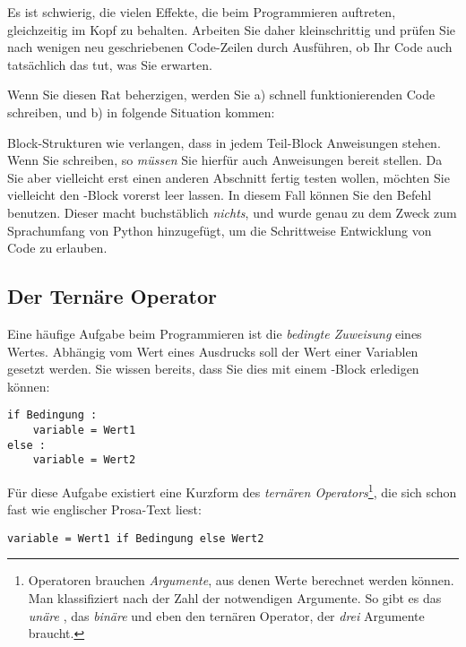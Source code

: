 \begin{hintbox}
Es ist schwierig, die vielen Effekte, die beim Programmieren auftreten, gleichzeitig im Kopf zu behalten. Arbeiten Sie daher kleinschrittig und prüfen Sie nach wenigen neu geschriebenen Code-Zeilen durch Ausführen, ob Ihr Code auch tatsächlich das tut, was Sie erwarten.

Wenn Sie diesen Rat beherzigen, werden Sie \newline
a) schnell funktionierenden Code schreiben, und \newline
b) in folgende Situation kommen:

Block-Strukturen wie  verlangen, dass in jedem Teil-Block Anweisungen stehen. Wenn Sie  schreiben, so \emph{müssen} Sie hierfür auch Anweisungen bereit stellen. Da Sie aber vielleicht erst einen anderen Abschnitt fertig testen wollen, möchten Sie vielleicht den -Block vorerst leer lassen. In diesem Fall können Sie den Befehl  benutzen. Dieser macht buchstäblich \emph{nichts}, und wurde genau zu dem Zweck zum Sprachumfang von Python hinzugefügt, um die Schrittweise Entwicklung von Code zu erlauben.
\end{hintbox}

\subsection{Der Ternäre Operator}
Eine häufige Aufgabe beim Programmieren ist die \emph{bedingte Zuweisung} eines Wertes. Abhängig vom Wert eines Ausdrucks soll der Wert einer Variablen gesetzt werden. Sie wissen bereits, dass Sie dies mit einem -Block erledigen können:
\begin{codebox}
\begin{verbatim}
if Bedingung :
    variable = Wert1
else :
    variable = Wert2
\end{verbatim}
\end{codebox}

Für diese Aufgabe existiert eine Kurzform des \emph{ternären Operators}\footnote{Operatoren brauchen \emph{Argumente}, aus denen Werte berechnet werden können. Man klassifiziert nach der Zahl der notwendigen Argumente. So gibt es das \emph{unäre} , das \emph{binäre} \inPy{+} und eben den ternären Operator, der \emph{drei} Argumente braucht.}, die sich schon fast wie englischer Prosa-Text liest:

\begin{codebox}
\begin{verbatim}
variable = Wert1 if Bedingung else Wert2
\end{verbatim}
\end{codebox}

